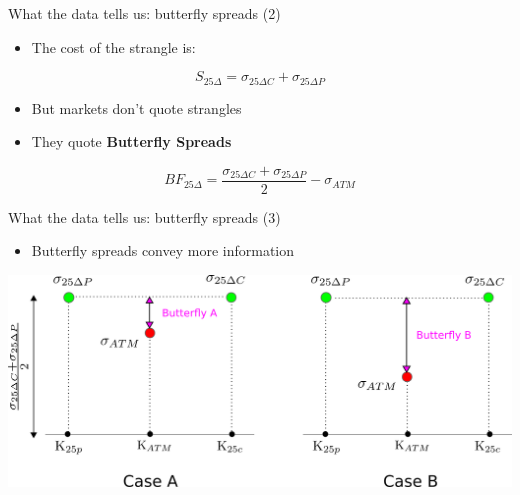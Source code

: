 \documentclass[ignorenonframetext,aspectratio=169]{beamer}
\providecommand{\tightlist}{%
  \setlength{\itemsep}{0pt}\setlength{\parskip}{0pt}}
\begin{document}
\begin{frame}{What the data tells us: butterfly spreads (2)}

\begin{itemize}
\tightlist
\item
  The cost of the strangle is:
\end{itemize}

\[
S_{25\Delta} = \sigma_{25\Delta C} + \sigma_{25\Delta P}
\]

\begin{itemize}
\tightlist
\item
  But markets don't quote strangles\\[2\baselineskip]
\item
  They quote \textbf{Butterfly Spreads}
\end{itemize}

\[
BF_{25\Delta} = \frac{\sigma_{25\Delta C} + \sigma_{25\Delta P}}{2}  - \sigma_{ATM}
\]

\end{frame}

\begin{frame}{What the data tells us: butterfly spreads (3)}

\begin{itemize}
\tightlist
\item
  Butterfly spreads convey more information
\end{itemize}

\begin{center}\includegraphics[width=1\linewidth]{images/figStrangleButterfly} \end{center}

\end{frame}
\end{document}
